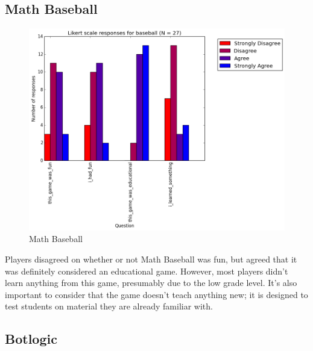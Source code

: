 			\subsection{Math Baseball}

				\begin{figure}[] 
				\centering 
				\includegraphics[width=\textwidth, height=.4\textheight, keepaspectratio=true]{baseball_likert.png} 
				\caption{Math Baseball}
				\end{figure}

				Players disagreed on whether or not Math Baseball was fun, but agreed that it was definitely considered an educational game. However, most players didn't learn anything from this game, presumably due to the low grade level. It's also important to consider that the game doesn't teach anything new; it is designed to test students on material they are already familiar with.

			\subsection{Botlogic}

